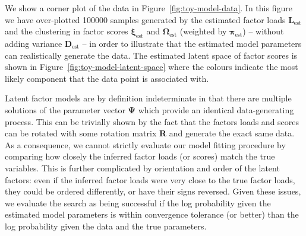 \documentclass[twocolumn]{aastex61}
\newcommand{\vect}[1]{\boldsymbol{\mathbf{#1}}}
\renewcommand{\vec}[1]{\vect{#1}}
\newcommand{\weight}{\pi}
\newcommand{\factorloads}{\textbf{L}}
\newcommand{\specificvariance}{\vec{D}}
\newcommand{\scoremeans}{\vec\xi}
\newcommand{\scorecovs}{\vec\Omega}
\begin{document}
We show a corner plot of the data in Figure~\ref{fig:toy-model-data}.
In this figure we have over-plotted 100000 samples generated by the
estimated factor loads $\factorloads_\textrm{est}$ and the clustering in factor 
scores $\scoremeans_\textrm{est}$ and $\scorecovs_\textrm{est}$ (weighted by $\vec\weight_\textrm{est}$)
-- without adding variance $\specificvariance_\textrm{est}$ %
-- in order to illustrate that the
estimated model parameters can realistically generate the data.
The estimated latent space of factor scores is shown in 
Figure~\ref{fig:toy-model-latent-space} where the colours indicate the
most likely component that the data point is associated with.

Latent factor models are by definition indeterminate in that there are
multiple solutions of the parameter vector $\vec\Psi$ which provide
an identical data-generating process. This can be trivially shown by
the fact that the factors loads and scores can be rotated with some rotation
matrix $\textbf{R}$ and generate the exact same data. As a consequence,
we cannot strictly evaluate our model fitting procedure by comparing
how closely the inferred factor loads (or scores) match the true 
variables. This is further complicated by orientation and order
of the latent factors: even if the inferred factor loads were very close
to the true factor loads, they could be ordered differently, or have
their signs reversed. Given these issues, we evaluate the search as
being successful if the log probability given the estimated model
parameters is within convergence tolerance (or better) than the
log probability given the data and the true parameters.


\end{document}
